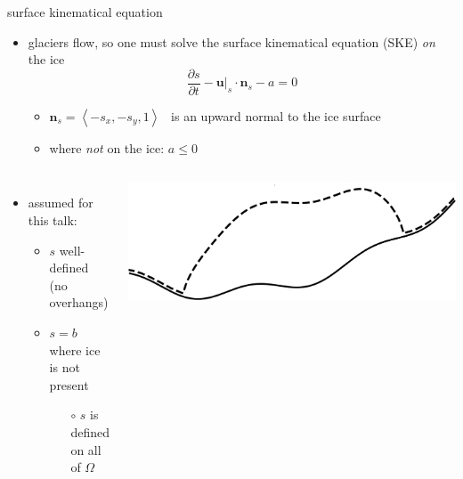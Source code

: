 \documentclass[usepdftitle=false,usenames,dvipsnames]{beamer}
\newcommand{\bn}{\mathbf{n}}
\newcommand{\bu}{\mathbf{u}}
\begin{document}
\begin{frame}{surface kinematical equation}

\begin{itemize}
\item glaciers flow, so one must solve the surface kinematical equation (SKE) \emph{on} the ice
    $$\frac{\partial s}{\partial t} - \bu|_s \cdot \bn_s - a = 0$$

    \begin{itemize}
    \item $\bn_s = \left<-s_x,-s_y,1\right>$  \, is an upward normal to the ice surface
    \item where \emph{not} on the ice: $a\le 0$
    \end{itemize}
\end{itemize}

\bigskip
\begin{columns}
        \begin{itemize}
        \item assumed for this talk:
            \begin{itemize}
            \item $s$ well-defined (no overhangs)
            \item $s=b$ where ice is not present

                \begin{itemize}
                \item[{\color{black} $\circ$}] $s$ is defined on all of $\Omega$
                \end{itemize}
            \end{itemize}
        \end{itemize}
        \includegraphics[width=1.0\textwidth]{figs/simpledomain.png}
\end{columns}
\end{frame}
\end{document}
